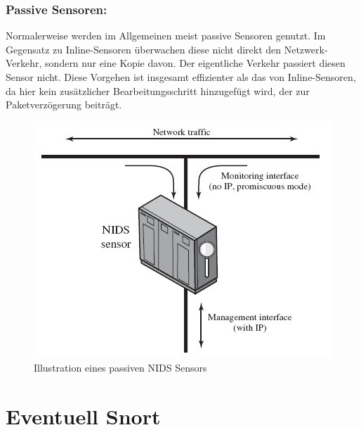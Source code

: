 \subsubsection{Passive Sensoren:}
Normalerweise werden im Allgemeinen meist passive Sensoren genutzt. Im Gegensatz zu Inline-Sensoren überwachen diese nicht direkt den Netzwerk-Verkehr, sondern nur eine Kopie davon. Der eigentliche Verkehr passiert diesen Sensor nicht. Diese Vorgehen ist insgesamt effizienter als das von Inline-Sensoren, da hier kein zusätzlicher Bearbeitungsschritt hinzugefügt wird, der zur Paketverzögerung beiträgt.\cite{url_sensors}\cite{IDS_Book_2}

\begin{figure}
\includegraphics[width=\textwidth]{img/passive_sensor.jpg}
\caption{Illustration eines passiven NIDS Sensors} \label{fig1}
\end{figure}

\section{Eventuell Snort}